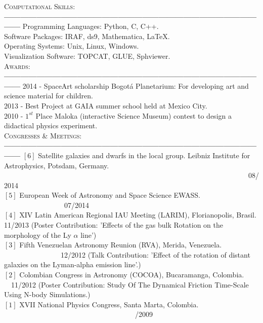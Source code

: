 \documentclass[letterpaper]{article}
\begin{document}
\textsc{\Large Computational Skills}:\\
{\bf---------------------------------------------------------------------------------------------------}
Programming Languages: Python, C, C++.\\
Software Packages: IRAF, ds9, Mathematica, \LaTeX.\\
Operating Systems: Unix, Linux, Windows.\\
Visualization Software: TOPCAT, GLUE, Sphviewer.\\

\textsc{\Large Awards:}\\
{\bf---------------------------------------------------------------------------------------------------}
2014 - SpaceArt scholarship Bogot\'a Planetarium: For developing art and science material for children. \\
2013 - Best Project at GAIA summer school held at Mexico City.\\
2010 - $1^{st}$ Place Maloka (interactive Science Museum) contest to design a didactical physics experiment.\\

\textsc{\Large Congresses \& Meetings:}\\
{\bf---------------------------------------------------------------------------------------------------}
$\left[6\right]$ Satellite galaxies and dwarfs in the local group. Leibniz Institute for Astrophysics, Potsdam, Germany. \indent \indent \ \ \ \ \ \
\ \ \ \ \ \ \ \ \ \ \ \ \ \ \ \ \ \ \ \ \ \ \ \ \ \ \ \ \ \ \ \ \ \ \ \ \ \ \ \ \ \ \ \ \ \ \ \ \ \ \ \ \ \ \ \ \ \ \ \ \ \ \ 08/2014  \\
$\left[5\right]$ European Week of Astronomy and Space Science EWASS.  \indent \ \ \ \ \ \ \ \ \ \ \ \ \ \ \ \ \ 07/2014 \\
$\left[4\right]$ XIV Latin American Regional IAU Meeting (LARIM), Florianopolis, Brasil.  11/2013
\normalsize {(Poster Contribution: 'Effects of the gas bulk Rotation on the morphology of the Ly $\alpha$ line')}\\
$\left[3\right]$\large{ Fifth Venezuelan Astronomy Reunion (RVA), Merida, Venezuela. \indent \ \ \ \  \ \ \ \ \ \ \ \ \ \ \ \ 12/2012}
\normalsize{(Talk Contribution: 'Effect of the rotation of distant galaxies on the Lyman-alpha emission line'.)}\\
$\left[2\right]$\large{ Colombian Congress in Astronomy (COCOA), Bucaramanga, Colombia. \indent \ \ 11/2012}
\normalsize{(Poster Contribution: Study Of The Dynamical Friction Time-Scale Using N-body Simulations.)}\\
$\left[1\right]$\large{ XVII National Physics Congress, Santa Marta, Colombia. \indent \ \ \ \ \ \ \ \ \ \ \ \ \ \ \ \ \  \ \ \ \ \ \ \ \ \ \ \ \ \ \ \ \ \ \ \ \   /2009}\\
\end{document}
